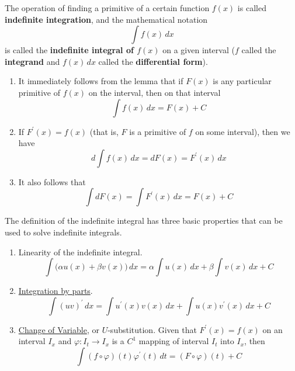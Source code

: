     \begin{definition}
      \label{def:indefinite-integration}
      The operation of finding a primitive of a certain function $f(x)$ is called \textbf{indefinite integration}, and the mathematical notation 
      \begin{equation}
        \int f(x) \,dx
      \end{equation}
      is called the \textbf{indefinite integral of $f(x)$} on a given interval ($f$ called the \textbf{integrand} and $f(x)\,dx$ called the \textbf{differential form}). 
      \begin{enumerate}
        \item It immediately follows from the lemma that if $F(x)$ is any particular primitive of $f(x)$ on the interval, then on that interval 
        \begin{equation}
          \int f(x) \,dx = F(x) + C
        \end{equation}
        \item If $F^\prime (x) = f(x)$ (that is, $F$ is a primitive of $f$ on some interval), then we have
        \begin{equation}
          d \int f(x)\,dx = d F(x) = F^\prime (x) \,dx
        \end{equation}
        \item It also follows that 
        \begin{equation}
          \int d F(x) = \int F^\prime (x)\,dx = F(x) + C
        \end{equation}
      \end{enumerate}
    \end{definition}

    \begin{theorem}
      \label{thm:basic-methods-of-indefinite-integration}
    The definition of the indefinite integral has three basic properties that can be used to solve indefinite integrals. 
    \begin{enumerate}
      \item Linearity of the indefinite integral.
      \begin{equation}
        \int \big( \alpha u(x) + \beta v(x)\big) \, dx = \alpha \int u(x)\,dx + \beta \int v(x)\,dx + C
      \end{equation}
      \item \hyperref[real-thm:integration-by-parts]{Integration by parts}. 
      \begin{equation}
        \int (u v)^\prime \,dx = \int u^\prime (x) v(x) \,dx + \int u(x) v^\prime (x) \,dx + C
      \end{equation}
      \item \hyperref[real-thm:change-of-variable]{Change of Variable}, or $U$-substitution. Given that $F^\prime (x) = f(x)$ on an interval $I_x$ and $\varphi: I_t \to I_x$ is a $C^1$ mapping of interval $I_t$ into $I_x$, then
      \begin{equation}
        \int (f \circ \varphi) (t) \varphi^\prime (t) \,dt = (F \circ \varphi)(t) + C
      \end{equation}
    \end{enumerate}
    \end{theorem}

